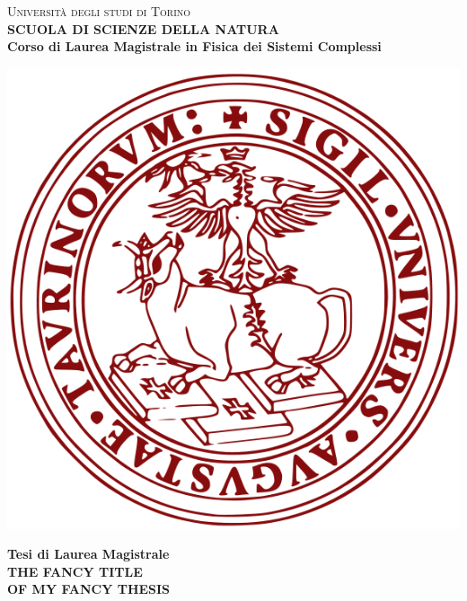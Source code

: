 \begin{titlepage}
\begin{center}
{{\Large{\textsc{Universit\`a degli studi di Torino \\}}}} \vspace{5mm} {\small{\bf SCUOLA DI SCIENZE DELLA NATURA\\ \vspace{3mm}
Corso di Laurea Magistrale in Fisica dei Sistemi Complessi}}
\vspace{5mm}
\end{center}
\begin{center}
\includegraphics[scale=.3]{head/logo.png}
\end{center}
\begin{center}
\vspace{5mm}
{\large{\bf Tesi di Laurea Magistrale\\}}
\vspace{5mm}
{\LARGE{\bf THE FANCY TITLE\\ OF MY FANCY THESIS\\}}
\end{center}
\vspace{20mm}
\par

\end{titlepage}

